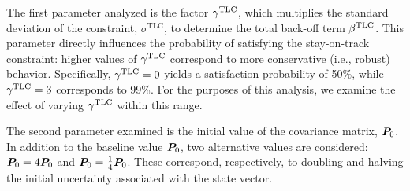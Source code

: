 The first parameter analyzed is the factor $\gamma^\textrm{TLC}$, which multiplies the standard deviation of the constraint, $\sigma^\textrm{TLC}$, to determine the total back-off term $\beta^\textrm{TLC}$. This parameter directly influences the probability of satisfying the stay-on-track constraint: higher values of $\gamma^\textrm{TLC}$ correspond to more conservative (i.e., robust) behavior. Specifically, $\gamma^\textrm{TLC} = 0$ yields a satisfaction probability of 50\%, while $\gamma^\textrm{TLC} = 3$ corresponds to 99\%. For the purposes of this analysis, we examine the effect of varying $\gamma^\textrm{TLC}$ within this range. 

The second parameter examined is the initial value of the covariance matrix, $\boldsymbol{P}_0$. In addition to the baseline value $\bar{\boldsymbol{P}}_0$, two alternative values are considered: $\boldsymbol{P}_0 = 4\bar{\boldsymbol{P}}_0$ and $\boldsymbol{P}_0 = \frac{1}{4}\bar{\boldsymbol{P}}_0$. These correspond, respectively, to doubling and halving the initial uncertainty associated with the state vector.

